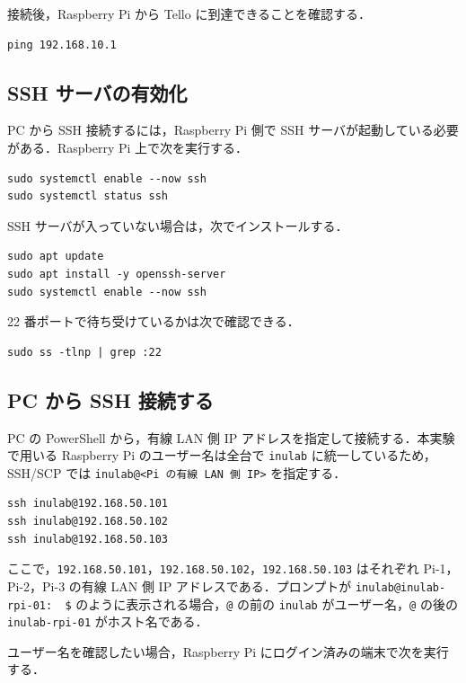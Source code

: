 接続後，Raspberry Pi から Tello に到達できることを確認する．

\begin{lstlisting}
ping 192.168.10.1
\end{lstlisting}

\subsection{SSH サーバの有効化}

PC から SSH 接続するには，Raspberry Pi 側で SSH サーバが起動している必要がある．Raspberry Pi 上で次を実行する．

\begin{lstlisting}
sudo systemctl enable --now ssh
sudo systemctl status ssh
\end{lstlisting}

SSH サーバが入っていない場合は，次でインストールする．

\begin{lstlisting}
sudo apt update
sudo apt install -y openssh-server
sudo systemctl enable --now ssh
\end{lstlisting}

22 番ポートで待ち受けているかは次で確認できる．

\begin{lstlisting}
sudo ss -tlnp | grep :22
\end{lstlisting}

\subsection{PC から SSH 接続する}

PC の PowerShell から，有線 LAN 側 IP アドレスを指定して接続する．本実験で用いる Raspberry Pi のユーザー名は全台で \texttt{inulab} に統一しているため，SSH/SCP では \texttt{inulab@<Pi の有線 LAN 側 IP>} を指定する．

\begin{lstlisting}
ssh inulab@192.168.50.101
ssh inulab@192.168.50.102
ssh inulab@192.168.50.103
\end{lstlisting}

ここで，\texttt{192.168.50.101}，\texttt{192.168.50.102}，\texttt{192.168.50.103} はそれぞれ Pi-1，Pi-2，Pi-3 の有線 LAN 側 IP アドレスである．プロンプトが \texttt{inulab@inulab-rpi-01:~ \$} のように表示される場合，\texttt{@} の前の \texttt{inulab} がユーザー名，\texttt{@} の後の \texttt{inulab-rpi-01} がホスト名である．

ユーザー名を確認したい場合，Raspberry Pi にログイン済みの端末で次を実行する．

